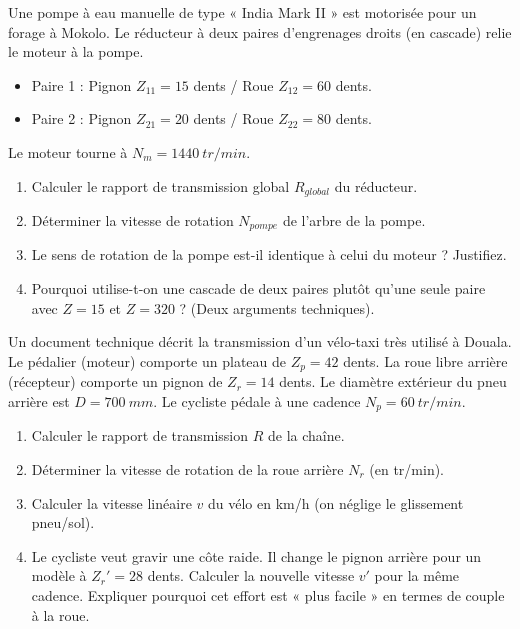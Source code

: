 \documentclass[11pt]{article}
\begin{document}
\begin{exercice}
Une pompe à eau manuelle de type « India Mark II » est motorisée pour un forage à Mokolo. Le réducteur à deux paires d'engrenages droits (en cascade) relie le moteur à la pompe. 
\begin{itemize}
    \item Paire 1 : Pignon $Z_{11} = 15$ dents / Roue $Z_{12} = 60$ dents.
    \item Paire 2 : Pignon $Z_{21} = 20$ dents / Roue $Z_{22} = 80$ dents.
\end{itemize}
Le moteur tourne à $N_m = \SI{1440}{tr/min}$.
\begin{enumerate}
    \item Calculer le rapport de transmission global $R_{global}$ du réducteur.
    \item Déterminer la vitesse de rotation $N_{pompe}$ de l'arbre de la pompe.
    \item Le sens de rotation de la pompe est-il identique à celui du moteur ? Justifiez.
    \item Pourquoi utilise-t-on une cascade de deux paires plutôt qu'une seule paire avec $Z=15$ et $Z=320$ ? (Deux arguments techniques).
\end{enumerate}
\end{exercice}

\begin{exercice}
Un document technique décrit la transmission d'un vélo-taxi très utilisé à Douala. Le pédalier (moteur) comporte un plateau de $Z_p = 42$ dents. La roue libre arrière (récepteur) comporte un pignon de $Z_r = 14$ dents. Le diamètre extérieur du pneu arrière est $D = \SI{700}{mm}$. Le cycliste pédale à une cadence $N_p = \SI{60}{tr/min}$.
\begin{enumerate}
    \item Calculer le rapport de transmission $R$ de la chaîne.
    \item Déterminer la vitesse de rotation de la roue arrière $N_r$ (en \si{tr/min}).
    \item Calculer la vitesse linéaire $v$ du vélo en \si{km/h} (on néglige le glissement pneu/sol).
    \item Le cycliste veut gravir une côte raide. Il change le pignon arrière pour un modèle à $Z_r' = 28$ dents. Calculer la nouvelle vitesse $v'$ pour la même cadence. Expliquer pourquoi cet effort est « plus facile » en termes de couple à la roue.
\end{enumerate}
\end{exercice}
\end{document}
